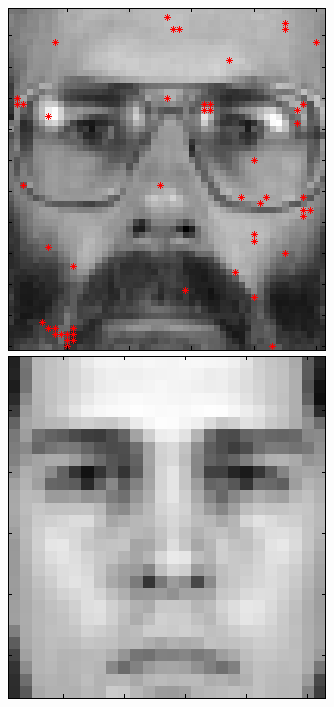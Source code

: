 \begin{figure}[ht]
 \includegraphics[width=\textwidth*11/100]{ch5/figures/XM2VTS_8_-1.png}\\
 \includegraphics[width=\textwidth*11/100]{ch5/figures/XM2VTS_1_0.png}

\end{figure}
